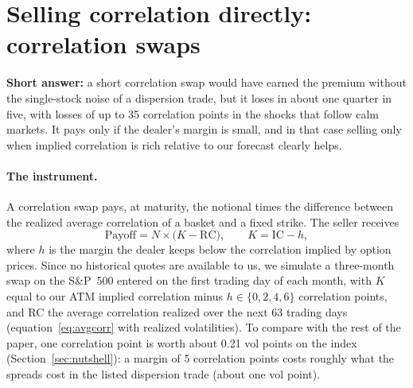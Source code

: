 \section{Selling correlation directly: correlation swaps}\label{sec:cswap}

\textbf{Short answer:} a short correlation swap would have earned the premium without the single-stock noise of a dispersion trade, but it loses in about one quarter in five, with losses of up to 35 correlation points in the shocks that follow calm markets. It pays only if the dealer's margin is small, and in that case selling only when implied correlation is rich relative to our forecast clearly helps.

\paragraph{The instrument.} A correlation swap pays, at maturity, the notional times the difference between the realized average correlation of a basket and a fixed strike. The seller receives
\begin{equation}\label{eq:cswap}
  \text{Payoff} = N \times \bigl(K - \text{RC}\bigr), \qquad K = \text{IC} - h ,
\end{equation}
where $h$ is the margin the dealer keeps below the correlation implied by option prices. Since no historical quotes are available to us, we simulate a three-month swap on the S\&P~500 entered on the first trading day of each month, with $K$ equal to our ATM implied correlation minus $h \in \{0, 2, 4, 6\}$ correlation points, and RC the average correlation realized over the next 63 trading days (equation~\eqref{eq:avgcorr} with realized volatilities). To compare with the rest of the paper, one correlation point is worth about 0.21 vol points on the index (Section~\ref{sec:nutshell}): a margin of 5 correlation points costs roughly what the spreads cost in the listed dispersion trade (about one vol point).

